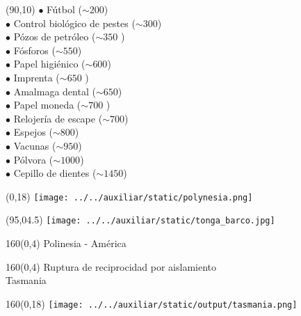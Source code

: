 \documentclass[shownotes,aspectratio=169]{beamer}
\begin{document}
\begin{frame}[plain]
 
 \begin{textblock}{70}(90,10) \footnotesize
 $\bullet$ Fútbol ($\sim 200$) \\
 $\bullet$ Control biológico de pestes ($\sim 300$) \\
 $\bullet$ Pózos de petróleo ($\sim 350$ ) \\
 $\bullet$ Fósforos ($\sim 550$) \\
 $\bullet$ Papel higiénico ($\sim 600$) \\
 $\bullet$ Imprenta ($\sim 650$ ) \\
 $\bullet$ Amalmaga dental ($\sim 650$) \\
 $\bullet$ Papel moneda ($\sim 700$ ) \\
 $\bullet$ Relojería de escape ($\sim 700$) \\
 $\bullet$ Espejos ($\sim 800$) \\
 $\bullet$ Vacunas ($\sim 950$) \\
 $\bullet$ Pólvora ($\sim 1000$) \\
 $\bullet$ Cepillo de dientes ($\sim 1450$)
 \end{textblock} 
 
  
\end{frame}


\begin{frame}[plain]
\begin{textblock}{95}(0,18) \centering
\texttt{[image: ../../auxiliar/static/polynesia.png]}  
\end{textblock} 

\begin{textblock}{60}(95,04.5) \centering
\texttt{[image: ../../auxiliar/static/tonga\_barco.jpg]}  
\end{textblock} 

\begin{textblock}{160}(0,4)
\centering \LARGE  \textcolor{black!85}{Polinesia - América}
\end{textblock}

\end{frame}

\begin{frame}[plain]
\begin{textblock}{160}(0,4)
\centering \LARGE  \textcolor{black!85}{Ruptura de reciprocidad por aislamiento} \\
\Large Tasmania
\end{textblock}

\begin{textblock}{160}(0,18)
  \centering
\texttt{[image: ../../auxiliar/static/output/tasmania.png]}  
  \end{textblock} 

\end{frame}
\end{document}
